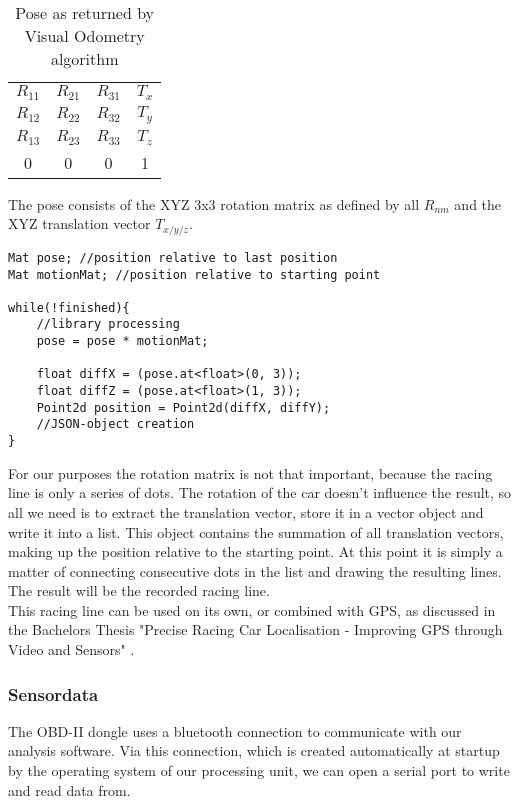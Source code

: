 \begin{table}[!ht]
 \begin{center}
  \begin{tabular}{c c c c}
   $R_{11}$ & $R_{21}$ & $R_{31}$ & $T_{x}$\\
   $R_{12}$ & $R_{22}$ & $R_{32}$ & $T_{y}$\\
   $R_{13}$ & $R_{23}$ & $R_{33}$ & $T_{z}$\\
   0 & 0 & 0 & 1
  \end{tabular}
 \end{center}
 \caption{Pose as returned by Visual Odometry algorithm}
\end{table}

The pose consists of the XYZ 3x3 rotation matrix as defined by all $R_{nm}$ and the XYZ translation vector $T_{x/y/z}$. 
\clearpage
\begin{lstlisting}
Mat pose; //position relative to last position
Mat motionMat; //position relative to starting point

while(!finished){
	//library processing
	pose = pose * motionMat;

	float diffX = (pose.at<float>(0, 3));
	float diffZ = (pose.at<float>(1, 3));
	Point2d position = Point2d(diffX, diffY);
	//JSON-object creation 
}
\end{lstlisting}

For our purposes the rotation matrix is not that important, because the racing line is only a series of dots. The rotation of the car doesn't influence the result, so all we need is to extract the translation vector, store it in a vector object and write it into a list. This object contains the summation of all translation vectors, making up the position relative to the starting point.
At this point it is simply a matter of connecting consecutive dots in the list and drawing the resulting lines. The result will be the recorded racing line.\\
This racing line can be used on its own, or combined with GPS, as discussed in the Bachelors Thesis "Precise Racing Car Localisation - Improving GPS through Video and Sensors" \cite{hoffmann16}.

\subsubsection{Sensordata}
The OBD-II dongle uses a bluetooth connection to communicate with our analysis software. Via this connection, which is created automatically at startup by the operating system of our processing unit, we can open a serial port to write and read data from.

